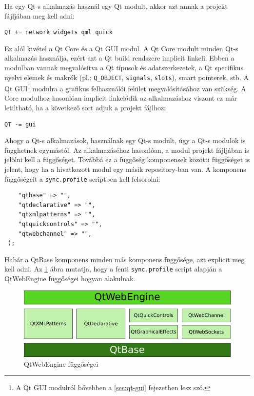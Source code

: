 \documentclass[12pt]{report}
\begin{document}
Ha egy Qt-s alkalmazás használ egy Qt modult, akkor azt annak a projekt fájljában meg kell
adni:
\begin{lstlisting}[title=app.pro]
 QT += network widgets qml quick
\end{lstlisting}
Ez alól kivétel a Qt Core és a Qt GUI modul. A Qt Core modult
minden Qt-s alkalmazás használja, ezért azt a Qt build rendszere implicit linkeli.
Ebben a modulban vannak megvalósítva a Qt típusok és adatszerkezetek, a Qt specifikus nyelvi
elemek és makrók (pl.: \texttt{Q\_OBJECT}, \texttt{signals}, \texttt{slots}),
smart pointerek, stb. A Qt GUI\footnote{A Qt GUI modulról bővebben a \ref{sec:qt-gui}
fejezetben lesz szó.} modulra a grafikus felhasználói felület megvalósításához van szükség.
A Core modulhoz hasonlóan implicit linkelődik az alkalmazáshoz viszont ez már letiltható, ha
a következő sort adjuk a projekt fájlhoz:
\begin{lstlisting}[title=app.pro]
 QT -= gui
\end{lstlisting}

Ahogy a Qt-s alkalmazások, használnak egy Qt-s modult, úgy a Qt-s modulok is függhetnek
egymástól. Az alkalmazáséhoz hasonlóan, a modul projekt fájljában is jelölni kell a
függőséget. Továbbá ez a függőség komponensek közötti függőséget is jelent, hogy ha
a hivatkozott modul egy másik repository-ban van. A komponens függőségeit a
\texttt{sync.profile} scriptben kell felsorolni:
\begin{lstlisting}[title=sync.profile]
 %dependencies = (
    "qtbase" => "",
    "qtdeclarative" => "",
    "qtxmlpatterns" => "",
    "qtquickcontrols" => "",
    "qtwebchannel" => "",
 );
\end{lstlisting}
Habár a QtBase komponens minden más komponens függősége, azt explicit meg kell adni.
Az \ref{fig:qtwebengine-dependencies} ábra mutatja, hogy a fenti \texttt{sync.profile} script
alapján a QtWebEngine függőségei hogyan alakulnak.

\begin{figure}[ht]
    \centering
    \includegraphics[scale=.6]{qtwebengine-dependencies}
    \caption{
        \label{fig:qtwebengine-dependencies}
        QtWebEngine függőségei
    }
\end{figure}
\end{document}
